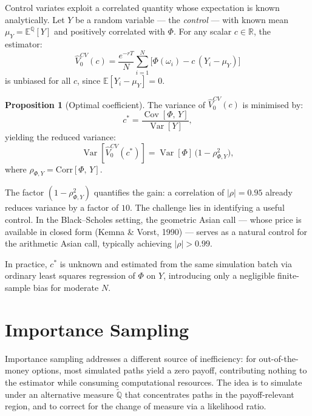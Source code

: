 \documentclass[12pt, a4paper]{report}
\theoremstyle{definition}
\newtheorem{proposition}{Proposition}[chapter]
\newcommand{\Q}{\mathbb{Q}}
\newcommand{\R}{\mathbb{R}}
\newcommand{\Var}{\operatorname{Var}}
\newcommand{\Cov}{\operatorname{Cov}}
\begin{document}
Control variates exploit a correlated quantity whose expectation is known
analytically.  Let $Y$ be a random variable --- the \emph{control} ---
with known mean $\mu_Y = \mathbb{E}^{\Q}[Y]$ and positively correlated
with $\Phi$.  For any scalar $c \in \R$, the estimator:
\begin{equation}
    \hat{V}_0^{CV}(c) = \frac{e^{-rT}}{N} \sum_{i=1}^{N}
    \bigl[\Phi(\omega_i) - c\,(Y_i - \mu_Y)\bigr]
    \label{eq:cv-estimator}
\end{equation}
is unbiased for all $c$, since $\mathbb{E}[Y_i - \mu_Y] = 0$.

\begin{proposition}[Optimal coefficient]
The variance of $\hat{V}_0^{CV}(c)$ is minimised by:
\begin{equation}
    c^* = \frac{\Cov[\Phi,\, Y]}{\Var[Y]},
    \label{eq:cv-optimal}
\end{equation}
yielding the reduced variance:
\begin{equation}
    \Var\!\left[\hat{V}_0^{CV}(c^*)\right]
    = \Var[\Phi]\,\bigl(1 - \rho_{\Phi,Y}^2\bigr),
    \label{eq:cv-variance}
\end{equation}
where $\rho_{\Phi,Y} = \mathrm{Corr}[\Phi,\, Y]$.
\end{proposition}

The factor $(1 - \rho_{\Phi,Y}^2)$ quantifies the gain: a correlation
of $|\rho| = 0.95$ already reduces variance by a factor of $10$.  The
challenge lies in identifying a useful control.  In the Black--Scholes
setting, the geometric Asian call --- whose price is available in closed
form (Kemna \& Vorst, 1990) --- serves as a natural control for the
arithmetic Asian call, typically achieving $|\rho| > 0.99$.

In practice, $c^*$ is unknown and estimated from the same simulation
batch via ordinary least squares regression of $\Phi$ on $Y$,
introducing only a negligible finite-sample bias for moderate $N$.

\section{Importance Sampling}
\label{sec:importance-sampling}

Importance sampling addresses a different source of inefficiency: for
out-of-the-money options, most simulated paths yield a zero payoff,
contributing nothing to the estimator while consuming computational
resources.  The idea is to simulate under an alternative measure
$\tilde{\Q}$ that concentrates paths in the payoff-relevant region, and
to correct for the change of measure via a likelihood ratio.
\end{document}
